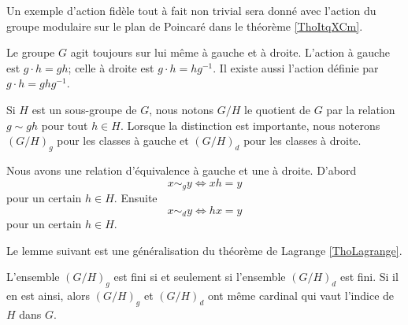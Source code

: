 Un exemple d'action fidèle tout à fait non trivial sera donné avec l'action du groupe modulaire sur le plan de Poincaré dans le théorème \ref{ThoItqXCm}.

Le groupe \( G\) agit toujours sur lui même à gauche et à droite. L'action à gauche est \( g\cdot h=gh\); celle à droite est \( g\cdot h=hg^{-1}\). Il existe aussi l'action  définie par \( g\cdot h=ghg^{-1}\).

Si \( H\) est un sous-groupe de  \( G\), nous notons \( G/H\) le quotient de $G$ par la relation \( g\sim gh\) pour tout \( h\in H\). Lorsque la distinction est importante, nous noterons \( (G/H)_g\) pour les classes à gauche et \( (G/H)_d\) pour les classes à droite.

Nous avons une relation d'équivalence à gauche et une à droite. D'abord
\begin{equation}
    x\sim_g y\Leftrightarrow xh=y
\end{equation}
pour un certain \( h\in H\). Ensuite
\begin{equation}
    x\sim_d y\Leftrightarrow hx=y
\end{equation}
pour un certain \( h\in H\). 

Le lemme suivant est une généralisation du théorème de Lagrange \ref{ThoLagrange}.

\begin{lemma}
    L'ensemble \( (G/H)_g\) est fini si et seulement si l'ensemble \( (G/H)_d\) est fini. Si il en est ainsi, alors \( (G/H)_g\) et \( (G/H)_d\) ont même cardinal qui vaut l'indice de \( H\) dans \( G\).
\end{lemma}

